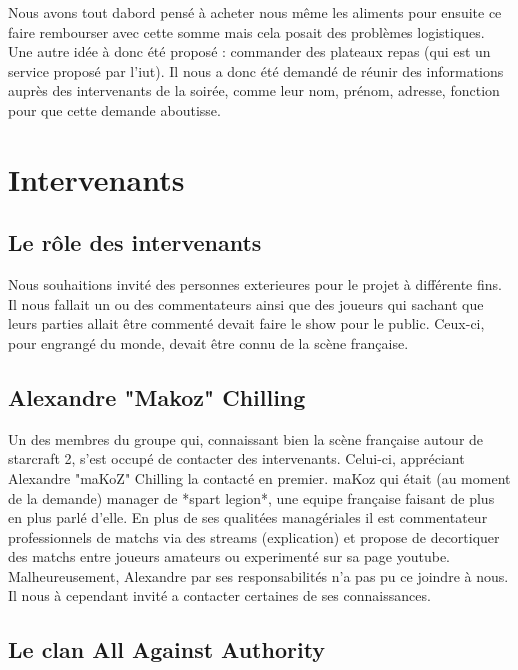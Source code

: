 Nous avons tout dabord pensé à acheter nous même les aliments pour
ensuite ce faire rembourser avec cette somme mais cela posait des
problèmes logistiques. Une autre idée à donc été proposé : commander des
plateaux repas (qui est un service proposé par l'iut). Il nous a donc
été demandé de réunir des informations auprès des intervenants de la
soirée, comme leur nom, prénom, adresse, fonction pour que cette demande
aboutisse.

\section{Intervenants}%
\label{sec:intervenants}

\subsection{Le rôle des intervenants}%
\label{sub:le_role_des_intervenants}

Nous souhaitions invité des personnes exterieures pour le projet à
différente fins. Il nous fallait un ou des commentateurs ainsi que des
joueurs qui sachant que leurs parties allait être commenté devait faire
le show pour le public. Ceux-ci, pour engrangé du monde, devait être
connu de la scène française.

\subsection{Alexandre "Makoz" Chilling}%
\label{sub:alexandre_makoz_chilling}

Un des membres du groupe qui, connaissant bien la scène française autour
de starcraft 2, s'est occupé de contacter des intervenants.  Celui-ci,
appréciant Alexandre "maKoZ" Chilling la contacté en premier.  maKoz qui
était (au moment de la demande) manager de *spart legion*, une equipe
française faisant de plus en plus parlé d'elle. En plus de ses qualitées
managériales il est commentateur professionnels de matchs via des
streams (explication) et propose de decortiquer des matchs entre joueurs
amateurs ou experimenté sur sa page youtube. Malheureusement, Alexandre
par ses responsabilités n'a pas pu ce joindre à nous. Il nous à
cependant invité a contacter certaines de ses connaissances.

\subsection{Le clan All Against Authority}%
\label{sub:le_clan_all_against_authority}


